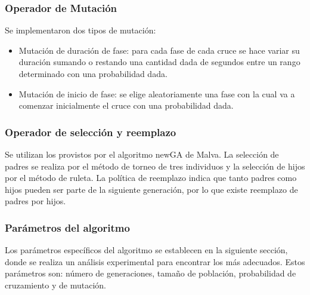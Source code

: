 \newpage
\subsubsection{Operador de Mutación}
Se implementaron dos tipos de mutación:
\begin{itemize}

\item Mutación de duración de fase: para cada fase de cada cruce se
hace variar su duración sumando o restando una cantidad dada
de segundos entre un rango determinado con una probabilidad
dada.
\item Mutación de inicio de fase: se elige aleatoriamente una fase
con la cual va a comenzar inicialmente el cruce con una probabilidad dada.

\end{itemize}

\subsubsection{Operador de selección y reemplazo}
Se  utilizan los provistos por el algoritmo newGA de Malva. La selección de padres se realiza por el método de torneo de tres individuos y la selección de hijos por el método de ruleta. La política de reemplazo indica que tanto padres como hijos pueden ser parte de la siguiente generación, por lo que existe reemplazo de padres por hijos.

\subsubsection{Parámetros del algoritmo}
Los parámetros específicos del algoritmo se establecen en la siguiente sección, donde se realiza un análisis experimental para encontrar los más adecuados. Estos parámetros son: número de generaciones, tamaño de población, probabilidad de cruzamiento y de mutación.